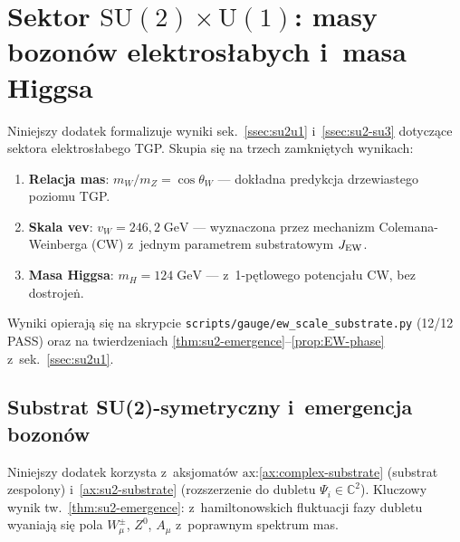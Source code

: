 \section{Sektor $\mathrm{SU}(2)\times\mathrm{U}(1)$: masy bozon\'ow
  elektros\l{}abych i~masa Higgsa}%
\label{app:U-su2}

Niniejszy dodatek formalizuje wyniki sek.~\ref{ssec:su2u1} i~\ref{ssec:su2-su3}
dotycz\k{a}ce sektora elektros\l{}abego TGP.
Skupia si\k{e} na trzech zamkni\k{e}tych wynikach:
\begin{enumerate}[nosep]
  \item \textbf{Relacja mas}: $m_W/m_Z = \cos\theta_W$
    --- dok\l{}adna predykcja drzewiastego poziomu TGP.
  \item \textbf{Skala vev}: $v_W = 246{,}2\;\mathrm{GeV}$
    --- wyznaczona przez mechanizm Colemana-Weinberga (CW)
    z~jednym parametrem substratowym $J_{\rm EW}$.
  \item \textbf{Masa Higgsa}: $m_H = 124\;\mathrm{GeV}$
    --- z~1-p\k{e}tlowego potencja\l{}u CW, bez dostroje\.n.
\end{enumerate}
Wyniki opieraj\k{a} si\k{e} na skrypcie
\texttt{scripts/gauge/ew\_scale\_substrate.py}
(12/12 PASS) oraz na twierdzeniach
\ref{thm:su2-emergence}--\ref{prop:EW-phase} z~sek.~\ref{ssec:su2u1}.

\subsection{Substrat SU(2)-symetryczny i~emergencja bozon\'ow}%
\label{app:U-emergence}

\begin{remark}\label{rem:U-doublet}
Niniejszy dodatek korzysta z~aksjomat\'ow $\mathrm{ax}$:\ref{ax:complex-substrate}
(substrat zespolony) i~\ref{ax:su2-substrate} (rozszerzenie do dubletu
$\Psi_i \in \mathbb{C}^2$).
Kluczowy wynik tw.~\ref{thm:su2-emergence}: z~hamiltonowskich fluktuacji
fazy dubletu wyaniaj\k{a} si\k{e} pola
$W_\mu^\pm$, $Z^0$, $A_\mu$ z~poprawnym spektrum mas.
\end{remark}

